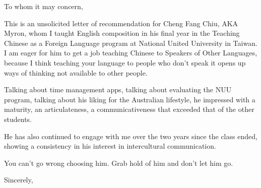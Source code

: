 \documentclass[11pt, a4paper]{letter} %
\begin{document}

\begin{letter}{
}


\opening{To whom it may concern,}

This is an unsolicited letter of recommendation for Cheng Fang Chiu, AKA
Myron, whom I taught English composition in his final year in the
Teaching Chinese as a Foreign Language program at National United
University in Taiwan. I am eager for him to get a job teaching
Chinese to Speakers of Other Languages, because I think teaching 
your language to people who don't speak it opens up ways of thinking
not available to other people.

Talking about time management apps, talking about evaluating the
NUU program, talking about his liking for the Australian lifestyle,
he impressed with a maturity, an articulateness, a communicativeness
that exceeded that of the other students.

He has also continued to engage with me over the two years since the class 
ended, showing a consistency in his interest in intercultural communication.

You can't go wrong choosing him. Grab hold of him and don't let
him go.

\closing{Sincerely,}




\end{letter}
\end{document}
